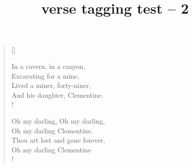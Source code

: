 \documentclass{article}
\title{verse tagging test -- 2}
\begin{document}
\settowidth{\versewidth}{In a cavern, in a canyon,}
\begin{verse}[\versewidth]
\begin{altverse}
 In a cavern, in a canyon, \\
Excavating for a mine, \\
Lived a miner, forty-niner, \label{vs:49} \\
And his daughter, Clementine. \\!
\end{altverse}
\begin{altverse}
 Oh my darling, Oh my darling, \\
Oh my darling Clementine. \\
Thou art lost and gone forever, \\
Oh my darling Clementine \\!
\end{altverse}
\end{verse}
\end{document}

